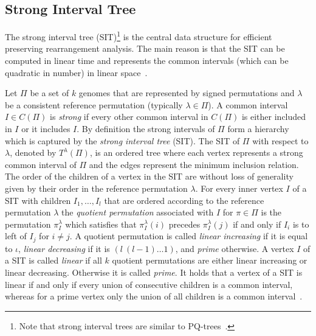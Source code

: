 \documentclass{svmult}
\begin{document}
\subsection{Strong Interval Tree}
\label{sec:SIT}

The strong interval tree (SIT)\footnote{Note that strong interval trees are similar to PQ-trees~\cite{Booth_1976}.} is the 
central data structure for efficient preserving rearrangement analysis. The main reason is that the SIT can be computed in linear 
time and represents the common intervals (which can be quadratic in
number) in linear space~\cite{Berard_2007}.

Let $\Pi$ be a set of $k$ genomes that are represented by signed permutations and $\lambda$ be a consistent reference permutation (typically $\lambda\in\Pi$). 
A common interval $I \in C(\Pi)$ is \emph{strong} if every other common
interval in $C(\Pi)$ is either included in $I$ or it includes $I$. By
definition the strong intervals of $\Pi$ form a hierarchy which is captured by the
\emph{strong interval tree} (SIT). The SIT of $\Pi$ with respect to $\lambda$, denoted by ${T}^{\lambda}(\Pi)$, is an ordered tree where each vertex represents a strong common interval of $\Pi$ and the edges represent the minimum inclusion relation. The order of the children of a vertex in the SIT are without loss of generality given by their order in the reference permutation $\lambda$.
For every inner vertex $I$ of a SIT with children $I_1,\ldots,I_l$ that are ordered according to the reference permutation $\lambda$ the \emph{quotient permutation} associated with $I$ for $\pi\in \Pi$ is the permutation
$\pi_I^\lambda$ which satisfies that $\pi^\lambda_I(i)$ precedes
$\pi^\lambda_I(j)$ if and only if $I_i$ is to left of $I_j$ for $i\neq j$.
A quotient permutation is called \emph{linear increasing} if it is equal to
$\iota$, \emph{linear decreasing} if it is $(l\ (l-1)\ldots 1)$, and \emph{prime} otherwise. 
A vertex $I$ of a SIT is called \emph{linear} if all $k$ quotient
permutations are either linear increasing or linear decreasing. Otherwise it is called \emph{prime}. It holds that a vertex
of a SIT is linear if and only if every union of consecutive children is a
common interval, whereas for a prime vertex only the union of all children
is a common interval~\cite{Berard_2007}.
\end{document}
